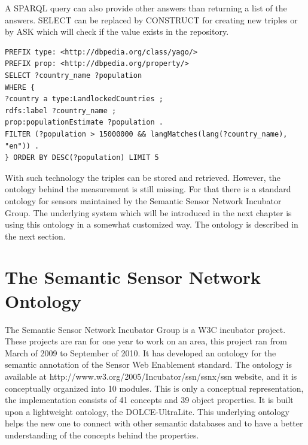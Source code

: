 A SPARQL query can also provide other answers than returning a list of the answers. SELECT can be replaced by CONSTRUCT for creating new triples or by ASK which will check if the value exists in the repository. 


\begin{lstlisting}[caption={Sample complex SPARQL which shows top 5 countries based on population using DBpedia\label{lst:sparqlcomplex}}]
PREFIX type: <http://dbpedia.org/class/yago/>
PREFIX prop: <http://dbpedia.org/property/>
SELECT ?country_name ?population
WHERE {
?country a type:LandlockedCountries ;
rdfs:label ?country_name ;
prop:populationEstimate ?population .
FILTER (?population > 15000000 && langMatches(lang(?country_name), "en")) .
} ORDER BY DESC(?population) LIMIT 5
\end{lstlisting}

With such technology the triples can be stored and retrieved. However, the ontology behind the measurement is still missing. For that there is a standard ontology for sensors maintained by the Semantic Sensor Network Incubator Group. The underlying system which will be introduced in the next chapter is using this ontology in a somewhat customized way\cite{g2d2}.  The ontology is described in the next section.

\section{The Semantic Sensor Network Ontology}

The Semantic Sensor Network Incubator Group is a W3C incubator project. These projects are ran for one year to work on an area, this project ran from March of 2009 to September of 2010. It has developed an ontology for the semantic annotation of the Sensor Web Enablement standard. The ontology is available at http://www.w3.org/2005/Incubator/ssn/ssnx/ssn website, and it is conceptually organized into 10 modules. This is only a conceptual representation, the implementation consists of 41 concepts and 39 object properties. It is built upon a lightweight ontology, the  DOLCE-UltraLite. This underlying ontology helps the new one to connect with other semantic databases and to have a better understanding of the concepts behind the properties. 


